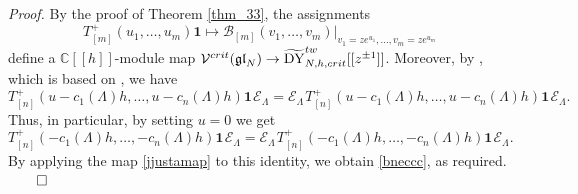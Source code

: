 \documentclass[12pt,a4paper,reqno]{amsart}
\theoremstyle{stil}
\theoremstyle{defi}
\theoremstyle{defi}
\theoremstyle{stil}
\theoremstyle{stil}
\theoremstyle{stil}
\theoremstyle{prim}
\newenvironment{prf}{\noindent \textit{Proof.}}{\null\hfill$\qed$\hskip
2mm\vskip 2mm}
\newcommand{\beq}{\begin{equation}}
\newcommand{\eeq}{\end{equation}}
\newcommand{\ts}{\hspace{1pt}}
\newcommand{\dyhocritt}{\widetilde{{\rm DY}}_{N,h,crit}^{tw} }
\newcommand{\vac}{ \mathrm{\boldsymbol{1}}}
\newcommand{\CC}{\mathbb{C}}
\newcommand{\Ec}{\mathcal{E}}
\newcommand{\Vccrit}{\mathcal{V}^{crit}(\mathfrak{gl}_N)}
\newcommand{\bc}{\mathcal{B}}
\begin{document}
\begin{prf}  By the proof of Theorem \ref{thm_33}, the assignments
\beq\label{jjustamap}
 T_{[m]}^+(u_1,\ldots ,u_m)\vac \mapsto
\bc_{[m]}(v_1, \ldots ,v_m ) \big|_{v_1=ze^{u_1},\ldots ,v_m=ze^{u_m}}
\eeq
define a $\CC[[h]]$-module map $\Vccrit \to \dyhocritt[[z^{\pm 1}]]$. Moreover, by \cite[Lemma 7.1 (a)]{BJK}, which is based on \cite[Lemma 3.2]{JLM0}, we have
$$
T_{[n]}^+(u-c_1(\Lambda)h,\ldots, u-c_n(\Lambda)h)\vac\ts \Ec_\Lambda = \Ec_\Lambda \ts T_{[n]}^+(u-c_1(\Lambda)h,\ldots, u-c_n(\Lambda)h)\vac \ts \Ec_\Lambda .
$$
Thus, in particular, by setting $u=0$ we get
$$
T_{[n]}^+( -c_1(\Lambda)h,\ldots,  -c_n(\Lambda)h)\vac\ts \Ec_\Lambda = \Ec_\Lambda \ts T_{[n]}^+( -c_1(\Lambda)h,\ldots,  -c_n(\Lambda)h)\vac \ts \Ec_\Lambda .
$$
By applying the map \eqref{jjustamap} to this identity, we obtain \eqref{bneccc}, as required.
\end{prf}
\end{document}
